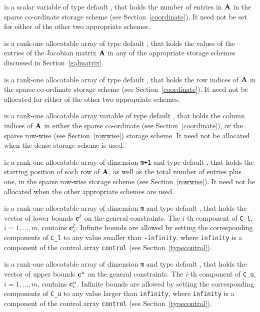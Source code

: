 \documentclass{galahad}
\begin{document}
\begin{description}
\begin{description}
 is a scalar variable of type default \integer, that
holds the number of entries in ${\mathbf{A}}$
in the sparse co-ordinate storage scheme (see Section~\ref{coordinate}).
It need not be set for either of the other two appropriate schemes.

 is a rank-one allocatable array of type default \realdp, that holds
the values of the entries of the Jacobian matrix ${\mathbf{A}}$ in any of the
appropriate storage schemes discussed in Section~\ref{galmatrix}.

 is a rank-one allocatable array of type default \integer,
that holds the row indices of ${\mathbf{A}}$ in the sparse co-ordinate storage
scheme (see Section~\ref{coordinate}).
It need not be allocated for either of the other two appropriate schemes.

 is a rank-one allocatable array variable of type default \integer,
that holds the column indices of ${\mathbf{A}}$ in either the sparse co-ordinate
(see Section~\ref{coordinate}), or the sparse row-wise
(see Section~\ref{rowwise}) storage scheme.
It need not be allocated when the dense storage scheme is used.

 is a rank-one allocatable array of dimension {\tt m+1} and type
default \integer, that holds the
starting position of each row of ${\mathbf{A}}$, as well
as the total number of entries plus one, in the sparse row-wise storage
scheme (see Section~\ref{rowwise}). It need not be allocated when the
other appropriate schemes are used.

\end{description}

 is a rank-one allocatable array of dimension {\tt m} and type
default \realdp, that holds the vector of lower bounds ${\mathbf{c}}^{l}$
on the general constraints. The $i$-th component of
{\tt C\_l}, $i = 1, \ldots , m$, contains ${\mathbf{c}}_{i}^{l}$.
Infinite bounds are allowed by setting the corresponding
components of {\tt C\_l} to any value smaller than {\tt -infinity},
where {\tt infinity} is a component of the control array {\tt control}
(see Section~\ref{typecontrol}).

 is a rank-one allocatable array of dimension {\tt m} and type
default \realdp, that holds the vector of upper bounds ${\mathbf{c}}^{u}$
on the general constraints. The $i$-th component of
{\tt C\_u}, $i = 1,  \ldots ,  m$, contains ${\mathbf{c}}_{i}^{u}$.
Infinite bounds are allowed by setting the corresponding
components of {\tt C\_u} to any value larger than {\tt infinity},
where {\tt infinity} is a component of the control array {\tt control}
(see Section~\ref{typecontrol}).


\end{description}
\end{document}

